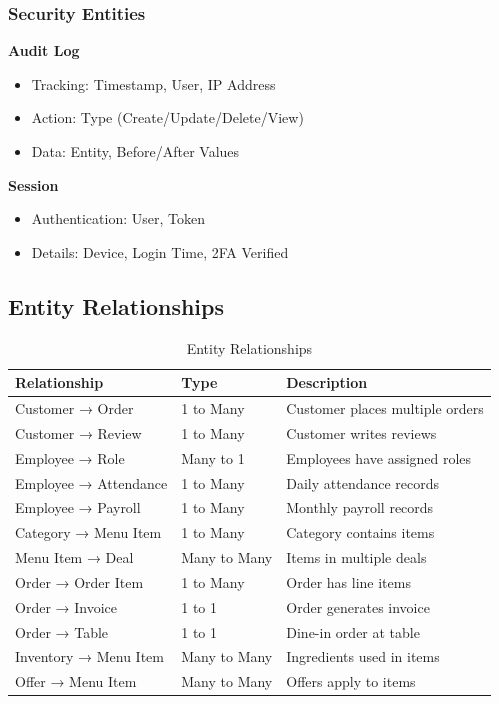 \documentclass[12pt,a4paper]{article}
\begin{document}
\subsubsection{Security Entities}

\textbf{Audit Log}
\begin{itemize}
    \item Tracking: Timestamp, User, IP Address
    \item Action: Type (Create/Update/Delete/View)
    \item Data: Entity, Before/After Values
\end{itemize}

\textbf{Session}
\begin{itemize}
    \item Authentication: User, Token
    \item Details: Device, Login Time, 2FA Verified
\end{itemize}

\subsection{Entity Relationships}

\begin{table}[h]
\centering
\begin{tabular}{@{}lll@{}}
\toprule
\textbf{Relationship} & \textbf{Type} & \textbf{Description} \\
\midrule
Customer → Order & 1 to Many & Customer places multiple orders \\
Customer → Review & 1 to Many & Customer writes reviews \\
Employee → Role & Many to 1 & Employees have assigned roles \\
Employee → Attendance & 1 to Many & Daily attendance records \\
Employee → Payroll & 1 to Many & Monthly payroll records \\
Category → Menu Item & 1 to Many & Category contains items \\
Menu Item → Deal & Many to Many & Items in multiple deals \\
Order → Order Item & 1 to Many & Order has line items \\
Order → Invoice & 1 to 1 & Order generates invoice \\
Order → Table & 1 to 1 & Dine-in order at table \\
Inventory → Menu Item & Many to Many & Ingredients used in items \\
Offer → Menu Item & Many to Many & Offers apply to items \\
\bottomrule
\end{tabular}
\caption{Entity Relationships}
\end{table}
\end{document}

